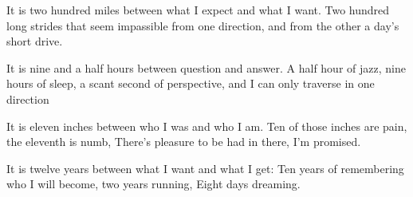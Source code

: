 It is two hundred miles between what I expect and what I want. Two hundred long strides that seem impassible from one direction, and from the other a day's short drive.

It is nine and a half hours between question and answer. A half hour of jazz, nine hours of sleep, a scant second of perspective, and I can only traverse in one direction

It is eleven inches between who I was and who I am. Ten of those inches are pain, the eleventh is numb, There's pleasure to be had in there, I'm promised.

It is twelve years between what I want and what I get: Ten years of remembering who I will become, two years running, Eight days dreaming.
